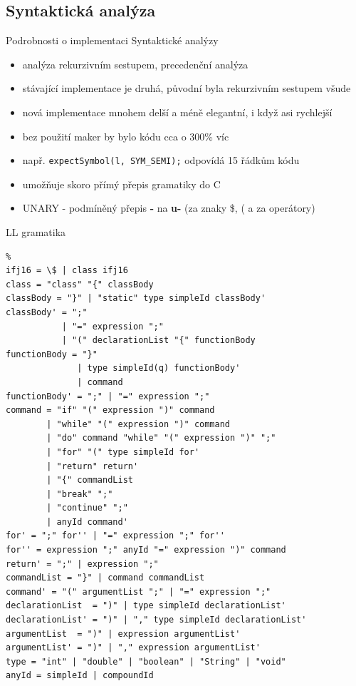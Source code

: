 \documentclass[13pt]{beamer}
\begin{document}
\subsection{Syntaktická analýza}

\begin{frame}{Podrobnosti o implementaci Syntaktické analýzy}
  \begin{itemize}
  \item analýza rekurzivním sestupem, precedenční analýza
  \item stávající implementace je druhá, původní byla rekurzivním sestupem všude
  \item nová implementace mnohem delší a méně elegantní, i když asi rychlejší
  \item bez použití maker by bylo kódu cca o 300\% víc
  \item např. \texttt{expectSymbol(l, SYM\_SEMI);} odpovídá 15 řádkům kódu
  \item umožňuje skoro přímý přepis gramatiky do C
  \item UNARY - podmíněný přepis \textbf{-} na \textbf{u-} (za znaky \$, ( a za operátory)
  \end{itemize}
\end{frame}

\begin{frame}[fragile]{LL gramatika}
\begin{lrbox}{\grammarbox}%
    \begin{lstlisting}%
ifj16 = \$ | class ifj16
class = "class" "{" classBody
classBody = "}" | "static" type simpleId classBody'
classBody' = ";"
           | "=" expression ";"
           | "(" declarationList "{" functionBody
functionBody = "}"
              | type simpleId(q) functionBody'
              | command
functionBody' = ";" | "=" expression ";"
command = "if" "(" expression ")" command
        | "while" "(" expression ")" command
        | "do" command "while" "(" expression ")" ";"
        | "for" "(" type simpleId for'
        | "return" return'
        | "{" commandList
        | "break" ";"
        | "continue" ";"
        | anyId command'
for' = ";" for'' | "=" expression ";" for''
for'' = expression ";" anyId "=" expression ")" command
return' = ";" | expression ";"
commandList = "}" | command commandList
command' = "(" argumentList ";" | "=" expression ";"
declarationList  = ")" | type simpleId declarationList'
declarationList' = ")" | "," type simpleId declarationList'
argumentList  = ")" | expression argumentList'
argumentList' = ")" | "," expression argumentList'
type = "int" | "double" | "boolean" | "String" | "void"
anyId = simpleId | compoundId
    \end{lstlisting}%
\end{lrbox}%
\scalebox{0.52}{\usebox{\grammarbox}}
\end{frame}
\end{document}
